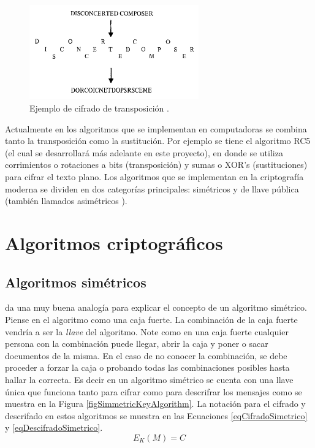 \begin{figure}
	\centering
	\includegraphics[width=0.65\textwidth]{./images/figExampleTranspositionCipher}
	\caption{Ejemplo de cifrado de transposición \citep{denning}.}
	\label{figExampleTranspositionCipher}
\end{figure}


Actualmente en los algoritmos que se implementan en computadoras se combina tanto la transposición como la sustitución. Por ejemplo se tiene el algoritmo RC5 (el cual se desarrollará más adelante en este proyecto), en donde se utiliza corrimientos o rotaciones a bits (transposición) y sumas o XOR's (sustituciones) para cifrar el texto plano. Los algoritmos que se implementan en la criptografía moderna se dividen en dos categorías principales: simétricos y de llave pública (también llamados asimétricos \citep{denning}).


\section{Algoritmos criptográficos}
\subsection{Algoritmos simétricos}
\cite{bruce} da una muy buena analogía para explicar el concepto de un algoritmo simétrico. Piense en el algoritmo como una caja fuerte. La combinación de la caja fuerte vendría a ser la \textit{llave} del algoritmo. Note como en una caja fuerte cualquier persona con la combinación puede llegar, abrir la caja y poner o sacar documentos de la misma. En el caso de no conocer la combinación, se debe proceder a forzar la caja o probando todas las combinaciones posibles hasta hallar la correcta. Es decir en un algoritmo simétrico se cuenta con una llave única que funciona tanto para cifrar como para descrifrar los mensajes como se muestra en la Figura \ref{figSimmetricKeyAlgorithm}. La notación para el cifrado y descrifado en estos algoritmos se muestra en las Ecuaciones \eqref{eqCifradoSimetrico} y \eqref{eqDescifradoSimetrico}.
\begin{equation}\label{eqCifradoSimetrico}
E_K (M) = C
\end{equation}

